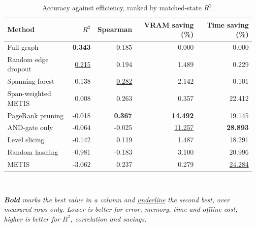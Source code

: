 \begin{table}[htbp]
\centering
\caption{Accuracy against efficiency, ranked by matched-state $R^2$.}
\label{tab:rq3_pareto}
\small
\begin{tabular}{lrrrr}
\toprule
\textbf{Method} & \textbf{$R^2$} & \textbf{Spearman} & \textbf{VRAM saving (\%)} & \textbf{Time saving (\%)} \\
\midrule
Full graph & \textbf{0.343} & 0.185 & 0.000 & 0.000 \\
Random edge dropout & \underline{0.215} & 0.194 & 1.489 & 0.229 \\
Spanning forest & 0.138 & \underline{0.282} & 2.142 & -0.101 \\
Span-weighted METIS & 0.008 & 0.263 & 0.357 & 22.412 \\
PageRank pruning & -0.018 & \textbf{0.367} & \textbf{14.492} & 19.145 \\
AND-gate only & -0.064 & -0.025 & \underline{11.257} & \textbf{28.893} \\
Level slicing & -0.142 & 0.119 & 1.487 & 18.291 \\
Random hashing & -0.981 & -0.183 & 3.100 & 20.996 \\
METIS & -3.062 & 0.237 & 0.279 & \underline{24.284} \\
\bottomrule
\end{tabular}
\\[4pt]\begin{minipage}{\linewidth}\footnotesize\emph{\textbf{Bold} marks the best value in a column and \underline{underline} the second best, over measured rows only. Lower is better for error, memory, time and offline cost; higher is better for $R^2$, correlation and savings.}\end{minipage}
\end{table}
